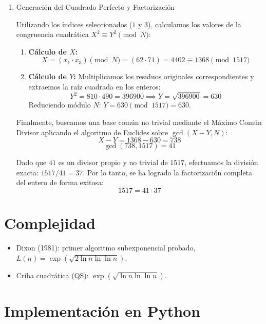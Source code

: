 \begin{ejemplo}
\begin{enumerate}
\item Generación del Cuadrado Perfecto y Factorización

Utilizando los índices seleccionados ($1$ y $3$), calculamos los valores de la congruencia cuadrática $X^2 \equiv Y^2 \pmod{N}$:

\begin{enumerate}
    \item \textbf{Cálculo de $X$:} 
    \[
    X = (x_1 \cdot x_3) \pmod{N} = (62 \cdot 71) = 4402 \equiv 1368 \pmod{1517}
    \]
    \item \textbf{Cálculo de $Y$:} Multiplicamos los residuos originales correspondientes y extraemos la raíz cuadrada en los enteros:
    \[
    Y^2 = 810 \cdot 490 = 396900 \implies Y = \sqrt{396900} = 630
    \]
    Reduciendo módulo $N$: $Y = 630 \pmod{1517} = 630$.
\end{enumerate}

Finalmente, buscamos una base común no trivial mediante el Máximo Común Divisor aplicando el algoritmo de Euclides sobre $\gcd(X - Y, N)$:
\[
X - Y = 1368 - 630 = 738
\]
\[
\gcd(738, 1517) = 41
\]

Dado que $41$ es un divisor propio y no trivial de $1517$, efectuamos la división exacta: $1517 / 41 = 37$. Por lo tanto, se ha logrado la factorización completa del entero de forma exitosa:
\[
1517 = 41 \cdot 37
\]
\end{enumerate}
\end{ejemplo}

\section{Complejidad}

\begin{itemize}
\item Dixon (1981): primer algoritmo subexponencial probado,
$L(n) = \exp(\sqrt{2 \ln n \ln \ln n})$.
\item Criba cuadrática (QS): $\exp(\sqrt{\ln n \ln \ln n})$.
\end{itemize}

\section{Implementación en Python}

